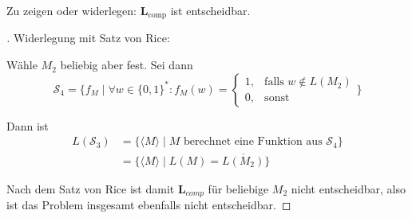 Zu zeigen oder widerlegen: $\mathbf{L}_\text{comp}$ ist entscheidbar.

\begin{proof}[\unskip\nopunct]
Widerlegung mit Satz von Rice:

Wähle $M_2$ beliebig aber fest. Sei dann
\[
	\mathcal{S}_4 = \{f_M \mid \forall w \in \{0, 1\}^* : f_M(w) =
		\begin{cases}
			1, & \text{falls } w \not\in L(M_2) \\
			0, & \text{sonst}
		\end{cases}
		\}
\]

Dann ist
\begin{align*}
	L(\mathcal{S}_3) &= \{ \langle M \rangle \mid M \text{ berechnet eine
		Funktion aus $\mathcal{S}_4$} \} \\
	&= \{ \langle M \rangle \mid L(M) = \overline{L(M_2)} \}
\end{align*}

Nach dem Satz von Rice ist damit $\mathbf{L}_{comp}$ für beliebige $M_2$ nicht
entscheidbar, also ist das Problem insgesamt ebenfalls nicht entscheidbar.

\end{proof}
